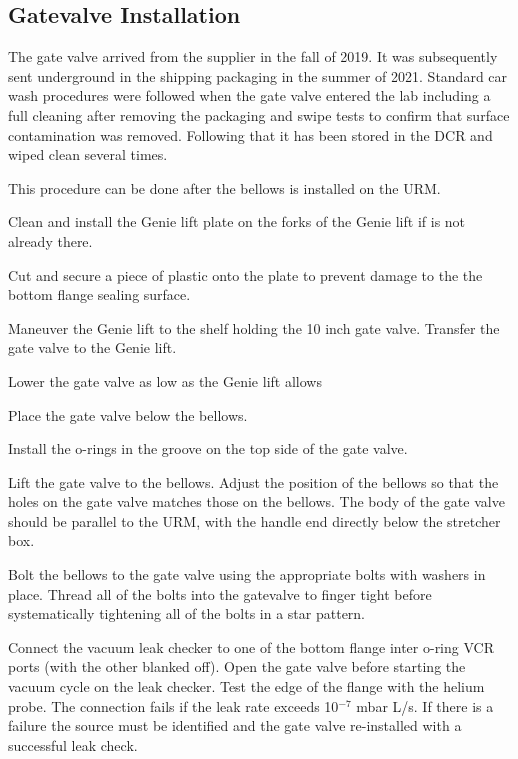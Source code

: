 \documentclass[11pt]{article}
\begin{document}
\subsection{Gatevalve Installation}\label{sss:GateValveInstall}
The gate valve arrived from the supplier in the fall of 2019. It was
subsequently sent underground in the shipping packaging in the summer
of 2021. Standard car wash procedures were followed when the gate
valve entered the lab including a full cleaning after removing the
packaging and swipe tests to confirm that surface contamination was
removed. Following that it has been stored in the DCR and wiped clean
several times.

This procedure can be done after the bellows is installed on
the URM. 
\begin{answerlist}
\item Clean and install the Genie lift plate on the forks of the Genie lift if is not already there.
\item Cut and secure a piece of plastic onto the plate to prevent damage to the the bottom flange sealing surface.
\item Maneuver the Genie lift to the shelf holding the 10 inch gate valve. Transfer the gate valve to the Genie lift.
\item Lower the gate valve as low as the Genie lift allows
\item Place the gate valve below the bellows.
\item Install the o-rings in the groove on the top side of the gate valve. 
\item Lift the gate valve to the bellows. Adjust the position of the
  bellows so that the holes on the gate valve matches those on the
  bellows. The body of the gate valve should be parallel to the URM,
  with the handle end directly below the stretcher box.
\item Bolt the bellows to the gate valve using the appropriate bolts with washers in place. Thread all of the bolts into the gatevalve to finger tight before systematically tightening all of the bolts in a star pattern.
 \item Connect the vacuum leak checker to one of the bottom flange inter o-ring VCR ports (with the other blanked off). Open the gate valve before starting the vacuum cycle on the leak checker. Test the edge of the flange with the helium probe. The connection fails if the leak rate exceeds 10$^{-7}$ mbar L/s. If there is a failure the source must be identified and the gate valve re-installed with a successful leak check. 
\end{answerlist}
\end{document}

